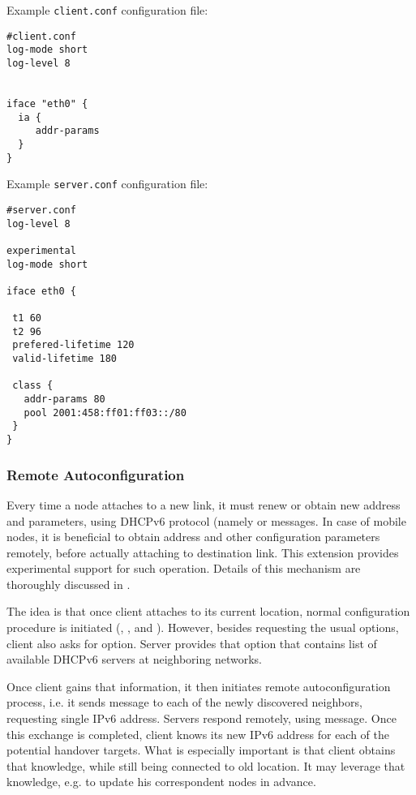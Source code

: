 Example \verb+client.conf+ configuration file:

\begin{lstlisting}
#client.conf
log-mode short
log-level 8


iface "eth0" {
  ia {
     addr-params
  }
}
\end{lstlisting}

Example \verb+server.conf+ configuration file:

\begin{lstlisting}
#server.conf
log-level 8

experimental
log-mode short

iface eth0 {

 t1 60
 t2 96
 prefered-lifetime 120
 valid-lifetime 180

 class {
   addr-params 80
   pool 2001:458:ff01:ff03::/80
 }
}
\end{lstlisting}

\subsubsection{Remote Autoconfiguration}
\label{feature-remote-autoconf}
Every time a node attaches to a new link, it must renew or
obtain new address and parameters, using DHCPv6 protocol (namely
 or  messages.  In case of mobile nodes,
it is beneficial to obtain address and other  configuration parameters
remotely, before actually attaching to destination link.  This
extension provides experimental support for such operation.
Details of this mechanism are thoroughly discussed in \cite{phd,
  draft-remote-autoconf, networks2010, atnac2010}.

The idea is that once client attaches to its current location, normal
configuration procedure is initiated (, ,
 and ). However, besides requesting the usual
options, client also asks for  option. Server provides
that option that contains list of available DHCPv6 servers at
neighboring networks.

Once client gains that information, it then initiates remote
autoconfiguration process, i.e. it sends  message to each
of the newly discovered neighbors, requesting single IPv6
address. Servers respond remotely, using  message. Once
this exchange is completed, client knows its new IPv6 address for each
of the potential handover targets. What is especially important is
that client obtains that knowledge, while still being connected to old
location. It may leverage that knowledge, e.g. to update his
correspondent nodes in advance.

